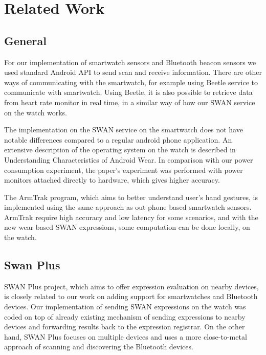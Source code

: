 
\chapter{Related Work} %

\label{Chapter2} %



\section{General}
For our implementation of smartwatch sensors and Bluetooth beacon sensors we used standard Android API to send scan and receive information.
There are other ways of communicating with the smartwatch, for example using Beetle\cite{beetle_mobisys16} service to communicate with smartwatch.
Using Beetle, it is also possible to retrieve data from heart rate monitor in real time, in a similar way of how our SWAN service on the watch works.

The implementation on the SWAN service on the smartwatch does not have notable differences compared to a regular android phone application.
An extensive description of the operating system on the watch is described in Understanding Characteristics of Android Wear\cite{android_wear_char}.
In comparison with our power consumption experiment, the paper's experiment was performed  with power monitors attached 
directly to hardware, which gives higher accuracy.

The ArmTrak\cite{arm_trak} program, which aims to better understand user's hand gestures, is implemented using the same approach as out phone based 
smartwatch sensors. ArmTrak require high accuracy and low latency for some scenarios, and with the new wear based SWAN expressions, some computation can be
done locally, on the watch.

\section{Swan Plus}
SWAN Plus\cite{swan_plus} project, which aims to offer expression evaluation on nearby devices, is closely related to our work on adding support for smartwatches and Bluetooth devices.
Our implementation of sending SWAN expressions on the watch was coded on top of already existing mechanism of sending expressions to nearby devices and forwarding results back to the expression
registrar. On the other hand, SWAN Plus focuses on multiple devices and uses a more close-to-metal approach of scanning and discovering the Bluetooth devices.

